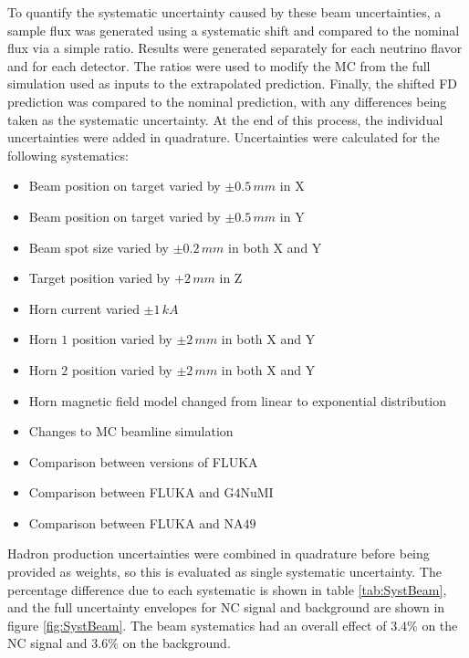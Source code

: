 To quantify the systematic uncertainty caused by these beam uncertainties, a sample flux was generated using a systematic shift and compared to the nominal flux via a simple ratio. Results were generated separately for each neutrino flavor and for each detector. The ratios were used to modify the MC from the full simulation used as inputs to the extrapolated prediction. Finally, the shifted FD prediction was compared to the nominal prediction, with any differences being taken as the systematic uncertainty. At the end of this process, the individual uncertainties were added in quadrature. Uncertainties were calculated for the following systematics:
\begin{singlespace}
\begin{itemize}
  \item Beam position on target varied by $\pm 0.5\,mm$ in X
  \item Beam position on target varied by $\pm 0.5\,mm$ in Y
  \item Beam spot size varied by $\pm 0.2\,mm$ in both X and Y
  \item Target position varied by $+ 2\, mm$ in Z
  \item Horn current varied $\pm 1\,kA$
  \item Horn $1$ position varied by $\pm 2\,mm$ in both X and Y
  \item Horn $2$ position varied by $\pm 2\,mm$ in both X and Y
  \item Horn magnetic field model changed from linear to exponential distribution
  \item Changes to MC beamline simulation
  \item Comparison between versions of FLUKA
  \item Comparison between FLUKA and G$4$NuMI
  \item Comparison between FLUKA and NA$49$
\end{itemize}
\end{singlespace}
\n Hadron production uncertainties were combined in quadrature before being provided as weights, so this is evaluated as single systematic uncertainty. The percentage difference due to each systematic is shown in table \ref{tab:SystBeam}, and the full uncertainty envelopes for NC signal and background are shown in figure \ref{fig:SystBeam}. The beam systematics had an overall effect of $3.4\%$ on the NC signal and $3.6\%$ on the background.
